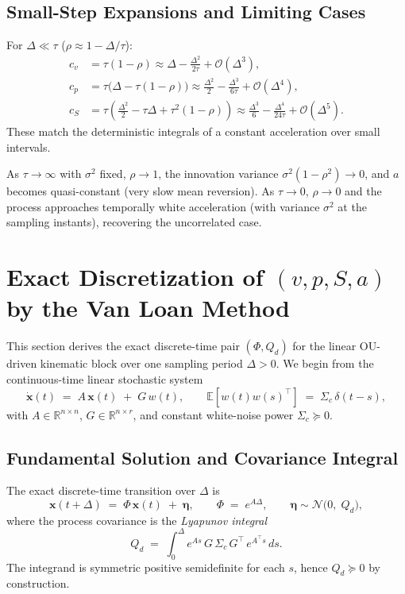 \documentclass[11pt]{article}
\begin{document}
\subsection{Small-Step Expansions and Limiting Cases}
For $\Delta\ll\tau$ ($\rho \approx 1-\Delta/\tau$):
\begin{align}
c_v &= \tau(1-\rho) \approx \Delta - \tfrac{\Delta^2}{2\tau} + \mathcal{O}(\Delta^3),\\
c_p &= \tau\big(\Delta - \tau(1-\rho)\big) \approx \tfrac{\Delta^2}{2} - \tfrac{\Delta^3}{6\tau} + \mathcal{O}(\Delta^4),\\
c_S &= \tau\!\left(\tfrac{\Delta^2}{2} - \tau\Delta + \tau^2(1-\rho)\right) \approx \tfrac{\Delta^3}{6} - \tfrac{\Delta^4}{24\tau} + \mathcal{O}(\Delta^5).
\end{align}
These match the deterministic integrals of a constant acceleration over small intervals.

As $\tau\to\infty$ with $\sigma^2$ fixed, $\rho\to 1$, the innovation variance $\sigma^2(1-\rho^2)\to 0$,
and $a$ becomes quasi-constant (very slow mean reversion). As $\tau\to 0$, $\rho\to 0$ and
the process approaches temporally white acceleration (with variance $\sigma^2$ at the sampling instants),
recovering the uncorrelated case.

\section{Exact Discretization of $(v,p,S,a)$ by the Van Loan Method}
\label{sec:van-loan}

This section derives the exact discrete-time pair $(\Phi,Q_d)$ for the linear OU-driven kinematic block
over one sampling period $\Delta>0$. We begin from the continuous-time linear stochastic system
\begin{equation}
\dot{\bm x}(t) \;=\; A\,\bm x(t) \;+\; G\,w(t), 
\qquad
\mathbb{E}\!\left[w(t)w(s)^\top\right] \;=\; \Sigma_c\,\delta(t-s),
\label{eq:lti-sde}
\end{equation}
with $A\in\mathbb{R}^{n\times n}$, $G\in\mathbb{R}^{n\times r}$, and constant white-noise power $\Sigma_c\succeq 0$.

\subsection{Fundamental Solution and Covariance Integral}
The exact discrete-time transition over $\Delta$ is
\begin{equation}
\bm x(t+\Delta) \;=\; \Phi\,\bm x(t) \;+\; \bm \eta,\qquad
\Phi \;=\; e^{A\Delta},\qquad
\bm\eta \sim \mathcal{N}\!\Big(0,\; Q_d \Big), 
\label{eq:phi-qd-def}
\end{equation}
where the process covariance is the \emph{Lyapunov integral}
\begin{equation}
Q_d \;=\; \int_0^\Delta e^{A s}\,G\,\Sigma_c\,G^\top\,e^{A^\top s}\,ds.
\label{eq:qd-integral}
\end{equation}
The integrand is symmetric positive semidefinite for each $s$, hence $Q_d\succeq 0$ by construction.
\end{document}
